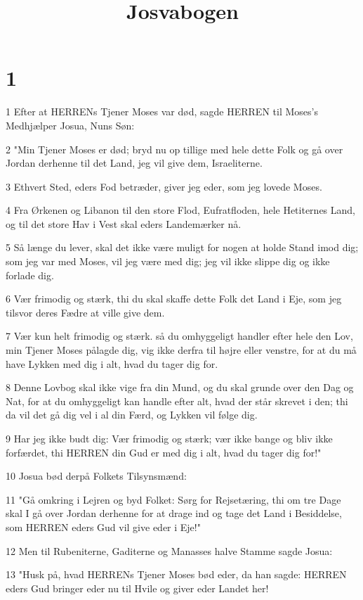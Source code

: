 

\title{Josvabogen}


\chapter{1}

\par 1 Efter at HERRENs Tjener Moses var død, sagde HERREN til Moses's Medhjælper Josua, Nuns Søn:
\par 2 "Min Tjener Moses er død; bryd nu op tillige med hele dette Folk og gå over Jordan derhenne til det Land, jeg vil give dem, Israeliterne.
\par 3 Ethvert Sted, eders Fod betræder, giver jeg eder, som jeg lovede Moses.
\par 4 Fra Ørkenen og Libanon til den store Flod, Eufratfloden, hele Hetiternes Land, og til det store Hav i Vest skal eders Landemærker nå.
\par 5 Så længe du lever, skal det ikke være muligt for nogen at holde Stand imod dig; som jeg var med Moses, vil jeg være med dig; jeg vil ikke slippe dig og ikke forlade dig.
\par 6 Vær frimodig og stærk, thi du skal skaffe dette Folk det Land i Eje, som jeg tilsvor deres Fædre at ville give dem.
\par 7 Vær kun helt frimodig og stærk. så du omhyggeligt handler efter hele den Lov, min Tjener Moses pålagde dig, vig ikke derfra til højre eller venstre, for at du må have Lykken med dig i alt, hvad du tager dig for.
\par 8 Denne Lovbog skal ikke vige fra din Mund, og du skal grunde over den Dag og Nat, for at du omhyggeligt kan handle efter alt, hvad der står skrevet i den; thi da vil det gå dig vel i al din Færd, og Lykken vil følge dig.
\par 9 Har jeg ikke budt dig: Vær frimodig og stærk; vær ikke bange og bliv ikke forfærdet, thi HERREN din Gud er med dig i alt, hvad du tager dig for!"
\par 10 Josua bød derpå Folkets Tilsynsmænd:
\par 11 "Gå omkring i Lejren og byd Folket: Sørg for Rejsetæring, thi om tre Dage skal I gå over Jordan derhenne for at drage ind og tage det Land i Besiddelse, som HERREN eders Gud vil give eder i Eje!"
\par 12 Men til Rubeniterne, Gaditerne og Manasses halve Stamme sagde Josua:
\par 13 "Husk på, hvad HERRENs Tjener Moses bød eder, da han sagde: HERREN eders Gud bringer eder nu til Hvile og giver eder Landet her!
